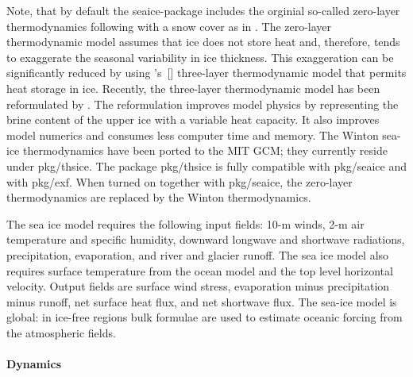 Note, that by default the seaice-package includes the orginial
so-called zero-layer thermodynamics following \citet{hib80} with a
snow cover as in \citet{zha98a}. The zero-layer thermodynamic model
assumes that ice does not store heat and, therefore, tends to
exaggerate the seasonal variability in ice thickness.  This
exaggeration can be significantly reduced by using
\citeauthor{sem76}'s~[\citeyear{sem76}] three-layer thermodynamic model
that permits heat storage in ice.  Recently, the three-layer
thermodynamic model has been reformulated by \citet{win00}.  The
reformulation improves model physics by representing the brine content
of the upper ice with a variable heat capacity.  It also improves
model numerics and consumes less computer time and memory.  The Winton
sea-ice thermodynamics have been ported to the MIT GCM; they currently
reside under pkg/thsice. The package pkg/thsice is fully compatible
with pkg/seaice and with pkg/exf. When turned on together with
pkg/seaice, the zero-layer thermodynamics are replaced by the Winton
thermodynamics.

The sea ice model requires the following input fields: 10-m winds, 2-m
air temperature and specific humidity, downward longwave and shortwave
radiations, precipitation, evaporation, and river and glacier runoff.
The sea ice model also requires surface temperature from the ocean
model and the top level horizontal velocity.  Output fields are
surface wind stress, evaporation minus precipitation minus runoff, net
surface heat flux, and net shortwave flux.  The sea-ice model is
global: in ice-free regions bulk formulae are used to estimate oceanic
forcing from the atmospheric fields.

\paragraph{Dynamics\label{sec:pkg:seaice:dynamics}}

